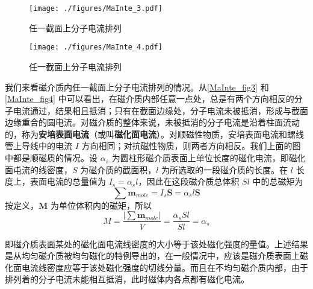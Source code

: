 \begin{figure}[ht]
\centering
\texttt{[image: ./figures/MaInte\_3.pdf]}
\caption{任一截面上分子电流排列} \label{MaInte_fig3}
\end{figure}
\begin{figure}[ht]
\centering
\texttt{[image: ./figures/MaInte\_4.pdf]}
\caption{任一截面上分子电流排列} \label{MaInte_fig4}
\end{figure}
我们来看磁介质内任一截面上分子电流排列的情况。从\autoref{MaInte_fig3} 和\autoref{MaInte_fig4} 中可以看出，在磁介质内部任意一点处，总是有两个方向相反的分子电流通过，结果相且抵消；只有在截面边缘处，分子电流未被抵消，形成与截面边缘重合的圆电流。对磁介质的整体来说，未被抵消的分子电流是沿着柱面流动的，称为\textbf{安培表面电流}（或叫\textbf{磁化面电流}）。对顺磁性物质，安培表面电流和螺线管上导线中的电流 $I$ 方向相同；对抗磁性物质，则两者方向相反。我们上面的图中都是顺磁质的情况。设 $\alpha_s$ 为圆柱形磁介质表面上单位长度的磁化电流，即磁化面屯流的线密度，$S$ 为磁介质的截面积，$ l $ 为所选取的一段磁介质的长度。在 $l $ 长度上，表面电流的总量值为 $I_s=\alpha_sl$，因此在这段磁介质总体积 $Sl$ 中的总磁矩为
\begin{equation}
\sum \mathbf{m}_{mole}=I_{s} \mathbf S=\alpha_{s} l \mathbf S
\end{equation}
按定义，$\mathbf  M $ 为单位体积内的磁矩，所以
\begin{equation}
M=\frac{\left|\sum \mathbf  m_{mole}\right|}{V}=\frac{\alpha_{s} S l}{S l}=\alpha_s
\end{equation}

即磁介质表面某处的磁化面电流线密度的大小等于该处磁化强度的量值。上述结果是从均匀磁介质被均匀磁化的特例导出的，在一般情况中，应该是磁介质表面上磁化面电流线密度应等于该处磁化强度的切线分量。而且在不均匀磁介质内部，由于排列着的分子电流未能相互抵消，此时磁体内各点都有磁化电流。

